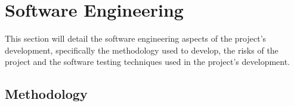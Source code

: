 \documentclass[12pt]{article}
\begin{document}
    \pagebreak


    \section{Software Engineering}\label{sec:software-engineering}

    \tab
    This section will detail the software engineering aspects of the project's development, specifically the
    methodology used to develop, the risks of the project and the software testing techniques used in the project's
    development.


    \subsection{Methodology}\label{subsec:methodology}

\end{document}
